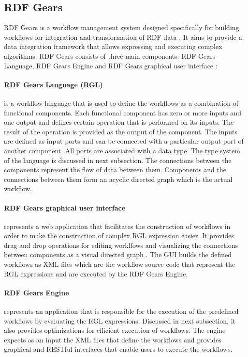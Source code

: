\subsection{RDF Gears}
\label{sec:backRDFGears}

RDF Gears is a workflow management system designed specifically for building workflows for integration and transformation of RDF data \cite{feliksik2011}. It aims to provide a data integration framework that allows expressing and executing complex algorithms. RDF Gears consists of three main components: RDF Gears Language, RDF Gears Engine and RDF Gears graphical user interface \cite{feliksik2011}:

\paragraph{RDF Gears Language (RGL)} is a workflow language that is used to define the workflows as a combination of functional components. Each functional component has zero or more inputs and one output and defines certain operation that is performed on its inputs. The result of the operation is provided as the output of the component. The inputs are defined as input ports and can be connected with a particular output port of another component. All ports are associated with a data type. The type system of the language is discussed in next subsection. The connections between the components represent the flow of data between them. Components and the connections between them form an acyclic directed graph which is the actual workflow. 

\paragraph{RDF Gears graphical user interface} represents a web application that facilitates the construction of workflows in order to make the construction of complex RGL expression easier. It provides drag and drop operations for editing worklfows and visualizing the connections between components as a visual directed graph \cite{maro2011}. The GUI builds the defined workflows as XML files which are the workflow source code that represent the RGL expressions and are executed by the RDF Gears Engine.

\paragraph{RDF Gears Engine} represents an application that is responsible for the execution of the predefined workflows by evaluating the RGL expressions. Discussed in next subsection, it also provides optimizations for efficient execution of workflows. The engine expects as an input the XML files that define the workflows and provides graphical and RESTful interfaces that enable users to execute the workflows. 

